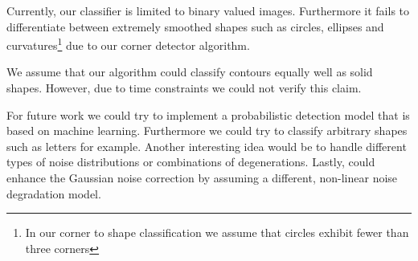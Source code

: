 \documentclass[conference]{IEEEtran}
\begin{document}
Currently, our classifier is limited to binary valued images. Furthermore it fails to differentiate between extremely smoothed shapes such as circles, ellipses and curvatures\footnote{In our corner to shape classification we assume that circles exhibit fewer than three corners} due to our corner detector algorithm.

We assume that our algorithm could classify contours equally well as solid shapes. 
However, due to time constraints we could not verify this claim.

For future work we could try to implement a probabilistic detection model that is based on machine learning. 
Furthermore we could try to classify arbitrary shapes such as letters for example. 
Another interesting idea would be to handle different types of noise distributions or combinations of degenerations. 
Lastly, could enhance the Gaussian noise correction by assuming a different, non-linear noise degradation model. 

%
%



%
%
\end{document}
